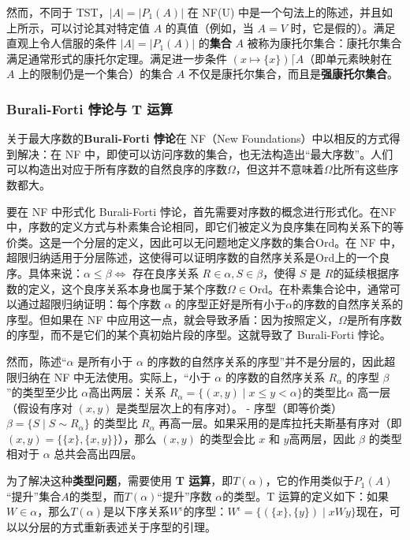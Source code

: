 然而，不同于 TST，\( |A| = |P_1(A)| \) 在 NF(U) 中是一个句法上的陈述，并且如上所示，可以讨论其对特定值 \( A \) 的真值（例如，当 \( A = V \) 时，它是假的）。满足直观上令人信服的条件 \( |A| = |P_1(A)| \) 的\textbf{集合} \( A \) 被称为康托尔集合：康托尔集合满足通常形式的康托尔定理。满足进一步条件 \((x \mapsto \{x\}) \lceil A\)（即单元素映射在 \( A \) 上的限制仍是一个集合）的集合 \( A \) 不仅是康托尔集合，而且是\textbf{强康托尔集合}。
\subsubsection{Burali-Forti 悖论与 T 运算 } 
关于最大序数的\textbf{Burali-Forti 悖论}在 NF（New Foundations）中以相反的方式得到解决：在 NF 中，即使可以访问序数的集合，也无法构造出“最大序数”。人们可以构造出对应于所有序数的自然良序的序数\( \Omega \)，但这并不意味着\(\Omega \)比所有这些序数都大。

要在 NF 中形式化 Burali-Forti 悖论，首先需要对序数的概念进行形式化。在NF中，序数的定义方式与朴素集合论相同，即它们被定义为良序集在同构关系下的等价类。这是一个分层的定义，因此可以无问题地定义序数的集合\( \mathrm{Ord} \)。在 NF 中，超限归纳适用于分层陈述，这使得可以证明序数的自然序关系是\( \mathrm{Ord} \)上的一个良序。具体来说：\(\alpha \leq \beta \iff \text{ 存在良序关系 } R \in \alpha, S \in \beta \text{，使得 } S \text{ 是 } R \text{的延续}\)根据序数的定义，这个良序关系本身也属于某个序数\(\Omega \in \mathrm{Ord}\)。在朴素集合论中，通常可以通过超限归纳证明：每个序数 \( \alpha \) 的序型正好是所有小于\( \alpha \)的序数的自然序关系的序型。但如果在 NF 中应用这一点，就会导致矛盾：因为按照定义，\( \Omega \)是所有序数的序型，而不是它们的某个真初始片段的序型。这就导致了 Burali-Forti 悖论。

然而，陈述“\( \alpha \) 是所有小于 \( \alpha \) 的序数的自然序关系的序型”并不是分层的，因此超限归纳在 NF 中无法使用。实际上，“小于 \( \alpha \) 的序数的自然序关系 \( R_{\alpha} \) 的序型 \( \beta \)”的类型至少比 \( \alpha \)高出两层：关系 \( R_{\alpha} = \{(x, y) \mid x \leq y < \alpha\} \)的类型比\( \alpha \) 高一层（假设有序对 \( (x, y) \) 是类型层次上的有序对）。
- 序型（即等价类）\( \beta = \{S \mid S \sim R_{\alpha}\} \) 的类型比 \( R_{\alpha} \) 再高一层。如果采用的是库拉托夫斯基有序对（即 \( (x, y) = \{\{x\}, \{x, y\}\} \)），那么 \( (x, y) \) 的类型会比 \( x \) 和 \( y \)高两层，因此 \( \beta \) 的类型相对于 \( \alpha \) 总共会高出四层。

为了解决这种\textbf{类型问题}，需要使用 \textbf{T 运算}，即\( T(\alpha)\)，它的作用类似于\( P_1(A) \)“提升”集合\( A \)的类型，而\( T(\alpha)\)“提升”序数 \( \alpha\)的类型。T 运算的定义如下：如果\( W \in \alpha \)，那么\( T(\alpha)\)是以下序关系\(W^{\iota}\)的序型：\(W^{\iota} = \{(\{x\}, \{y\}) \mid x W y\}\)现在，可以以分层的方式重新表述关于序型的引理。

